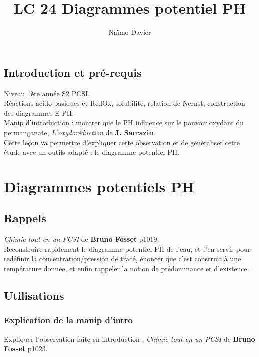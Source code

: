 \documentclass[12pt,prb,aps,epsf]{article}
\begin{document}
	
	\title{LC 24 Diagrammes potentiel PH}
	\author{Naïmo Davier}
	
	\maketitle
	
	\tableofcontents
	
	\pagebreak
	
\subsection{Introduction et pré-requis}
Niveau 1ère année S2 PCSI.\\
Réactions acido basiques et RedOx, solubilité, relation de Nernst, construction des diagrammes E-PH.\\

Manip d'introduction : montrer que le PH influence sur le pouvoir oxydant du permanganate, \textit{L'oxydoréduction} de \textbf{J. Sarrazin}.\\

Cette leçon va permettre d'expliquer cette observation et de généraliser cette étude avec un outils adapté : le diagramme potentiel PH.

\section{Diagrammes potentiels PH}
\subsection{Rappels}
\textit{Chimie tout en un PCSI} de \textbf{Bruno Fosset} p1019.\\

Reconstruire rapidement le diagramme potentiel PH de l'eau, et s'en servir pour redéfinir la concentration/pression de tracé, énoncer que c'est construit à une température donnée, et enfin rappeler la notion de prédominance et d'existence. 

\subsection{Utilisations}
\subsubsection{Explication de la manip d'intro}
Expliquer l'observation faite en introduction : \textit{Chimie tout en un PCSI} de \textbf{Bruno Fosset} p1023.\\
\end{document}
